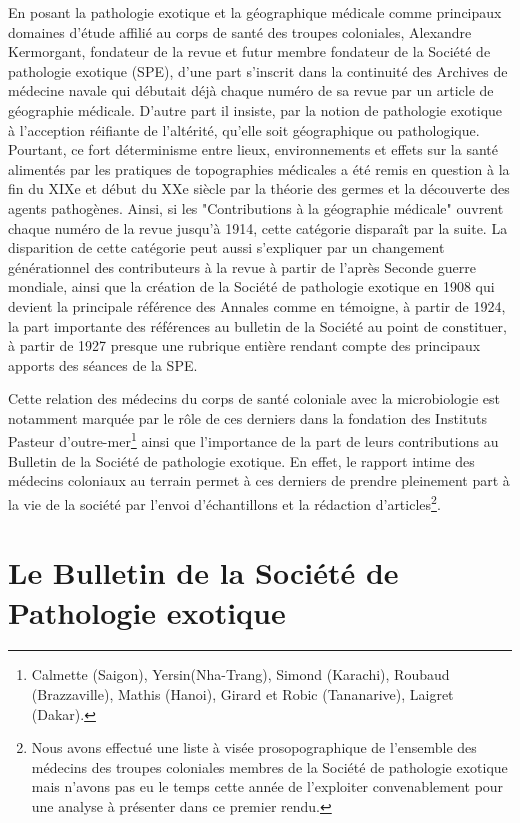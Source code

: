 En posant \og la pathologie exotique \fg et la \og géographique médicale \fg comme principaux domaines d'étude affilié au corps de santé des troupes coloniales, Alexandre Kermorgant, fondateur de la revue et futur membre fondateur de la Société de pathologie exotique (SPE), d'une part s'inscrit dans la continuité des Archives de médecine navale qui débutait déjà chaque numéro de sa revue par un article de géographie médicale. D'autre part il insiste, par la notion de \og pathologie exotique \fg à l'acception réifiante de l'altérité, qu'elle soit géographique ou pathologique. Pourtant, ce fort déterminisme entre lieux, environnements et effets sur la santé alimentés par les pratiques de topographies médicales a été remis en question à la fin du XIXe et début du XXe siècle par la théorie des germes et la découverte des agents pathogènes. Ainsi, si les "Contributions à la géographie médicale" ouvrent chaque numéro de la revue jusqu'à 1914, cette catégorie disparaît par la suite. La disparition de cette catégorie peut aussi s'expliquer par un changement générationnel des contributeurs à la revue à partir de l'après Seconde guerre mondiale, ainsi que la création de la Société de pathologie exotique en 1908 qui devient la principale référence des Annales comme en témoigne, à partir de 1924, la part importante des références au bulletin de la Société au point de constituer, à partir de 1927 presque une rubrique entière rendant compte des principaux apports des séances de la SPE. 

Cette relation des médecins du corps de santé coloniale avec la microbiologie est notamment marquée par le rôle de ces derniers dans la fondation des Instituts Pasteur d'outre-mer\footnote{Calmette (Saigon), Yersin(Nha-Trang), Simond (Karachi), Roubaud (Brazzaville), Mathis (Hanoi), Girard et Robic (Tananarive), Laigret (Dakar).} ainsi que l'importance de la part de leurs contributions au Bulletin de la Société de pathologie exotique. En effet, le rapport intime des médecins coloniaux au terrain permet à ces derniers de prendre pleinement part à la vie de la société par l'envoi d'échantillons et la rédaction d'articles\footnote{Nous avons effectué une liste à visée prosopographique de l'ensemble des médecins des troupes coloniales membres de la Société de pathologie exotique mais n'avons pas eu le temps cette année de l'exploiter convenablement pour une analyse à présenter dans ce premier rendu.}. 

\section{Le Bulletin de la Société de Pathologie exotique}

